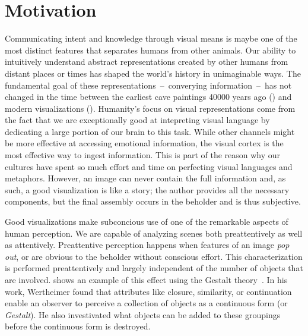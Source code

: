 \chapter{Motivation} \label{cha:motivation}
Communicating intent and knowledge through visual means is maybe one of the most distinct features that separates humans from other animals.  Our ability to intuitively understand abstract representations created by other humans from distant places or times has shaped the world's history in unimaginable ways.  The fundamental goal of these representations~--~converying information~--~has not changed in the time between the earliest cave paintings 40000 years ago () and modern visualizations ().  Humanity's focus on visual representations come from the fact that we are exceptionally good at intepreting visual language by dedicating a large portion of our brain to this task.  While other channels might be more effective at accessing emotional information, the visual cortex is the most effective way to ingest information.  This is part of the reason why our cultures have spent so much effort and time on perfecting visual languages and metaphors.  However, an image can never contain the full information and, as such, a good visualization is like a story; the author provides all the necessary components, but the final assembly occurs in the beholder and is thus subjective.

Good visualizations make subconcious use of one of the remarkable aspects of human perception.  We are capable of analyzing scenes both preattentively as well as attentively.  Preattentive perception happens when features of an image \emph{pop out}, or are obvious to the beholder without conscious effort.  This characterization is performed preattentively and largely independent of the number of objects that are involved.   shows an example of this effect using the Gestalt theory~\cite{wertheimer1922untersuchungen}.  In his work, Wertheimer found that attributes like closure, similarity, or continuation enable an observer to perceive a collection of objects as a continuous form (or \emph{Gestalt}).  He also investivated what objects can be added to these groupings before the continuous form is destroyed. 

